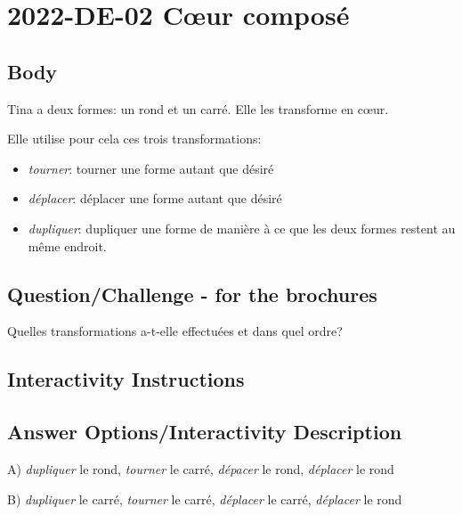 \documentclass[a4paper,11pt]{report}
\newcommand{\taskGraphicsFolder}{..}
\begin{document}
\section*{\centering{} 2022-DE-02 Cœur composé}


\subsection*{Body}

Tina a deux formes: un rond et un carré. Elle les transforme en cœur.

{\centering%
\par}

Elle utilise pour cela ces trois transformations:

\begin{itemize}
  \item \emph{tourner}: tourner une forme autant que désiré
  \item \emph{déplacer}: déplacer une forme autant que désiré
  \item \emph{dupliquer}: dupliquer une forme de manière à ce que les deux formes restent au même endroit.
\end{itemize}

{\em


\subsection*{Question/Challenge - for the brochures}

Quelles transformations a-t-elle effectuées et dans quel ordre?

}


\subsection*{Interactivity Instructions}



\begingroup
\renewcommand{\arraystretch}{1.5}
\subsection*{Answer Options/Interactivity Description}

A) \emph{dupliquer} le rond, \emph{tourner} le carré, \emph{dépacer} le rond, \emph{déplacer} le rond

B) \emph{dupliquer} le carré, \emph{tourner} le carré, \emph{déplacer} le carré, \emph{déplacer} le rond
\end{document}
